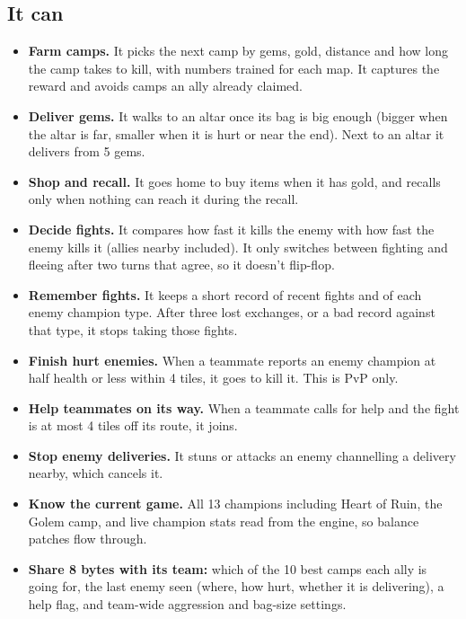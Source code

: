 \documentclass[11pt,a4paper]{article}
\begin{document}
\subsection*{It can}
\begin{itemize}
\item \textbf{Farm camps.} It picks the next camp by gems, gold, distance and how long the camp takes to
  kill, with numbers trained for each map. It captures the reward and avoids camps an ally already claimed.
\item \textbf{Deliver gems.} It walks to an altar once its bag is big enough (bigger when the altar is far,
  smaller when it is hurt or near the end). Next to an altar it delivers from 5 gems.
\item \textbf{Shop and recall.} It goes home to buy items when it has gold, and recalls only when nothing
  can reach it during the recall.
\item \textbf{Decide fights.} It compares how fast it kills the enemy with how fast the enemy kills it
  (allies nearby included). It only switches between fighting and fleeing after two turns that agree,
  so it doesn't flip-flop.
\item \textbf{Remember fights.} It keeps a short record of recent fights and of each enemy champion type.
  After three lost exchanges, or a bad record against that type, it stops taking those fights.
\item \textbf{Finish hurt enemies.} When a teammate reports an enemy champion at half health or less
  within 4 tiles, it goes to kill it. This is PvP only.
\item \textbf{Help teammates on its way.} When a teammate calls for help and the fight is at most 4 tiles
  off its route, it joins.
\item \textbf{Stop enemy deliveries.} It stuns or attacks an enemy channelling a delivery nearby, which
  cancels it.
\item \textbf{Know the current game.} All 13 champions including Heart of Ruin, the Golem camp, and live
  champion stats read from the engine, so balance patches flow through.
\item \textbf{Share 8 bytes with its team:} which of the 10 best camps each ally is going for, the last
  enemy seen (where, how hurt, whether it is delivering), a help flag, and team-wide aggression and
  bag-size settings.
\end{itemize}
\end{document}
